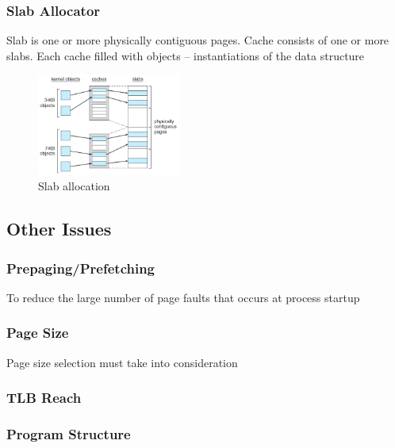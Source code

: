 \subsubsection{Slab Allocator}
Slab is one or more physically contiguous pages. Cache consists of one or more slabs.  Each cache filled with objects -- instantiations of the data
structure

\begin{figure}[!htb]
    \centering
    \includegraphics[width=0.42\textwidth]{pic/OS9/Slab allocation}
    \caption{Slab allocation}
\end{figure}


\subsection{Other Issues}
\subsubsection{Prepaging/Prefetching}
To reduce the large number of page faults that occurs at process startup

\subsubsection{Page Size}
Page size selection must take into consideration


\subsubsection{TLB Reach}

\subsubsection{Program Structure}

